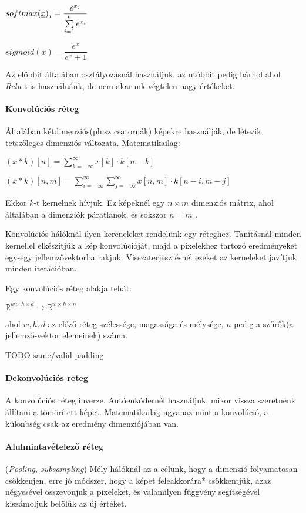 $ softmax(\underline{x})_j = \dfrac{e^{x_j}}{\sum\limits_{{i}=1}^{n}e^{x_i}} $


$ sigmoid(x) = \dfrac{e^x}{e^x + 1} $

\noindent
Az előbbit általában osztályozásnál használjuk, az utóbbit pedig 
bárhol ahol \textit{Relu}-t is használnánk, de nem akarunk végtelen 
nagy értékeket.



\paragraph{Konvolúciós réteg} Általában kétdimenziós(plusz csatornák) 
képekre használják, de létezik tetszőleges dimenziós változata. 
Matematikailag:


$ (x*k)[n] =  \sum\limits_{k=-\infty}^{\infty} x[k] \cdot k[n-k] $

$ (x*k)[n, m] =  
\sum\limits_{i=-\infty}^{\infty} 
\sum\limits_{j=-\infty}^{\infty} 
x[n, m] \cdot k[n-i, m-j] $

\noindent
Ekkor $ k $-t kernelnek hívjuk.
Ez képeknél egy $ n \times m $ dimenziós mátrix, 
ahol általában a dimenziók páratlanok, és sokszor $ n = m $ .


Konvolúciós hálóknál ilyen kereneleket rendelünk egy réteghez.
Tanításnál minden kernellel elkészítjük a kép konvolúcióját,
majd a pixelekhez tartozó eredményeket egy-egy jellemzővektorba rakjuk.
Visszaterjesztésnél ezeket az kerneleket javítjuk minden iterációban.

\noindent
Egy konvolúciós réteg alakja tehát:

$ \mathbb{R}^{w \times h \times d} \rightarrow \mathbb{R}^{w \times h \times n} $

\noindent
ahol $ w, h,d $ az előző réteg szélessége, magassága és mélysége, 
$ n $ pedig a szűrők(a jellemző-vektor elemeinek) száma.




TODO same/valid padding



\paragraph{Dekonvolúciós reteg}
A konvolúciós réteg inverze.
Autóenkódernél használjuk, mikor vissza szeretnénk állítani
a tömörített képet. Matematikailag ugyanaz mint a konvolúció,
a különbség csak az eredmény dimenziójában van.


\paragraph{Alulmintavételező réteg} (\textit{Pooling, subsampling})
Mély hálóknál az a célunk, hogy a dimenzió folyamatosan csökkenjen, erre 
jó módszer, hogy a képet feleakkorára* csökkentjük, azaz négyesével összevonjuk
a pixeleket, és valamilyen függvény segítségével kiszámoljuk belőlük az új értéket.


